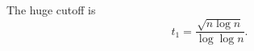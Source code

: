 \begin{definition}
The huge cutoff is
\[
t_1=\frac{\sqrt{n\log n}}{\log\log n}.
\]
\end{definition}
